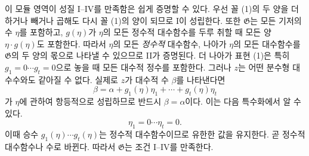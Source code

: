 
이 모듈 영역이 성질 I--IV를 만족함은 쉽게 증명할 수 있다. 우선 꼴 (1)의 두 양을 더하거나 빼거나 곱해도 다시 꼴 (1)의 양이 되므로 I이 성립한다. 또한 $\mathfrak G$는 모든 기저의 수 $\eta$를 포함하고, $g(\eta)$가 $\eta$의 모든 정수적 대수함수를 두루 취할 때 모든 양 $\eta\cdot g(\eta)$도 포함한다. 따라서 $\eta$의 모든 \emph{정수적} 대수함수, 나아가 $\eta$의 모든 대수함수를 $\mathfrak G$의 두 양의 몫으로 나타낼 수 있으므로 II가 증명된다. 더 나아가 표현 (1)은 특히 $g_1=0\cdots g_t=0$으로 놓을 때 모든 대수적 정수를 포함한다. 그러나 $z$는 어떤 분수형 대수수와도 같아질 수 없다. 실제로 $z$가 대수적 수 $\beta$를 나타낸다면
\[
 \beta=\alpha+g_1(\eta)\eta_1+\cdots+g_t(\eta)\eta_t
\]
가 $\eta$에 관하여 항등적으로 성립하므로 반드시 $\beta=\alpha$이다. 이는 다음 특수화에서 알 수 있다.
\[
 \eta_1=0\cdots \eta_t=0.
\]
이때 승수 $g_1(\eta)\cdots g_t(\eta)$는 정수적 대수함수이므로 유한한 값을 유지한다. 곧 정수적 대수함수나 수로 바뀐다. 따라서 $\mathfrak G$는 조건 I--IV를 만족한다.
